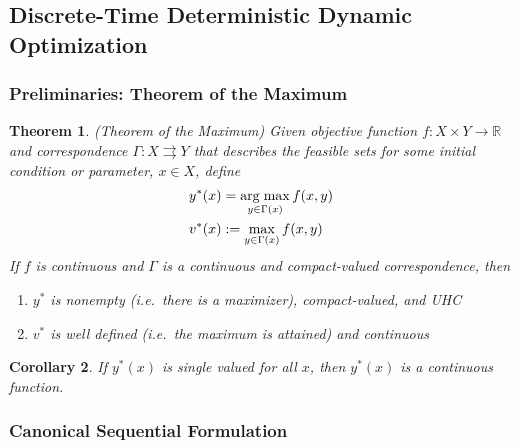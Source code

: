 \documentclass[12pt]{book}
\numberwithin{equation}{section} %
\theoremstyle{plain}
\newtheorem{thm}{Theorem}[section]
\newtheorem{cor}[thm]{Corollary}
\theoremstyle{definition}
\theoremstyle{remark}
\newcommand{\R}{\mathbb{R}}
\DeclareMathOperator*{\argmax}{arg\;max}
\begin{document}
\subsection{Discrete-Time Deterministic Dynamic Optimization}
\label{sec:discrete-dynamic}

\subsubsection{Preliminaries: Theorem of the Maximum}

\begin{thm}{\emph{(Theorem of the Maximum)}}
Given objective function $f:X\times Y\rightarrow\R$ and correspondence
$\Gamma:X\rightrightarrows Y$ that describes the feasible sets for some
initial condition or parameter, $x\in X$, define
\begin{align}
  y^*(x) &= \argmax_{y\in \Gamma(x)} f(x,y) \notag\\
  v^*(x) &:= \max_{y\in \Gamma(x)} f(x,y)
  \label{prob:thm-max}
\end{align}
If $f$ is continuous and $\Gamma$ is a continuous and compact-valued
correspondence, then
\begin{enumerate}
  \item $y^*$ is nonempty (i.e.\ there is a maximizer), compact-valued,
    and UHC
  \item $v^*$ is well defined (i.e.\ the maximum is attained) and
    continuous
\end{enumerate}
\end{thm}

\begin{cor}
If $y^*(x)$ is single valued for all $x$, then $y^*(x)$ is a continuous
function.
\end{cor}


\clearpage
\subsubsection{Canonical Sequential Formulation}
\end{document}
